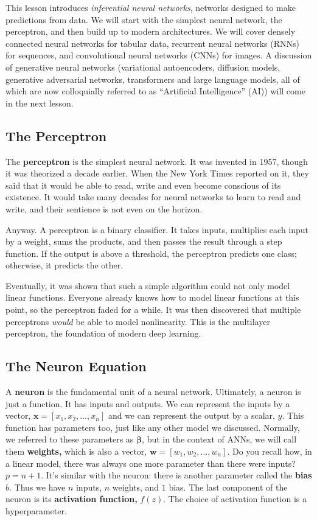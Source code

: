 This lesson introduces \textit{inferential neural networks}, networks designed to make predictions from data. We will start with the simplest neural network, the perceptron, and then build up to modern architectures. We will cover densely connected neural networks for tabular data, recurrent neural networks (RNNs) for sequences, and convolutional neural networks (CNNs) for images. A discussion of generative neural networks (variational autoencoders, diffusion models, generative adversarial networks, transformers and large language models, all of which are now colloquially referred to as ``Artificial Intelligence'' (AI)) will come in the next lesson.

\subsection*{The Perceptron}
The \textbf{perceptron} is the simplest neural network. It was invented in 1957, though it was theorized a decade earlier. When the New York Times reported on it, they said that it would be able to read, write and even become conscious of its existence. It would take many decades for neural networks to learn to read and write, and their sentience is not even on the horizon.

Anyway. A perceptron is a binary classifier. It takes inputs, multiplies each input by a weight, sums the products, and then passes the result through a step function. If the output is above a threshold, the perceptron predicts one class; otherwise, it predicts the other.

Eventually, it was shown that such a simple algorithm could not only model linear functions. Everyone already knows how to model linear functions at this point, so the perceptron faded for a while. It was then discovered that multiple perceptrons \textit{would} be able to model nonlinearity. This is the multilayer perceptron, the foundation of modern deep learning.

\subsection*{The Neuron Equation}
A \textbf{neuron} is the fundamental unit of a neural network. Ultimately, a neuron is just a function. It has inputs and outputs. We can represent the inputs by a vector, $\mathbf{x}=[x_1,x_2,\ldots,x_n]$ and we can represent the output by a scalar, $y$. This function has parameters too, just like any other model we discussed. Normally, we referred to these parameters as $\boldsymbol{\beta}$, but in the context of ANNs, we will call them \textbf{weights,} which is also a vector, $\mathbf{w}=[w_1,w_2,\ldots,w_n]$. Do you recall how, in a linear model, there was always one more parameter than there were inputs? $p=n+1$. It's similar with the neuron: there is another parameter called the \textbf{bias} $b$. Thus we have $n$ inputs, $n$ weights, and $1$ bias. The last component of the neuron is its \textbf{activation function,} $f(z)$. The choice of activation function is a hyperparameter.

